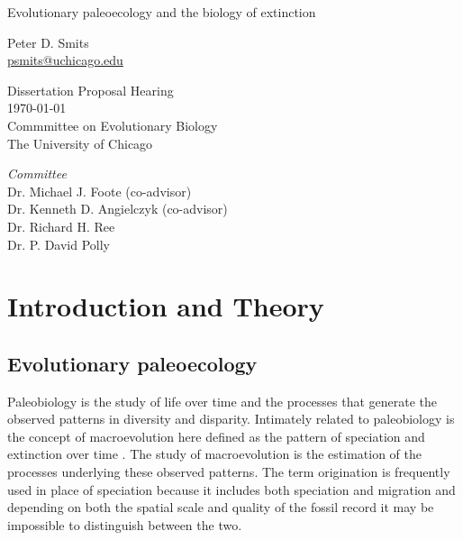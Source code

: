 \documentclass[12pt,letterpaper]{article}
\begin{document}
\setcounter{secnumdepth}{0}

\begin{titlepage}
  \begin{center}
    \huge{Evolutionary paleoecology and the biology of extinction}

    \vspace{1.5cm}

    \large{Peter D. Smits \\}
    \footnotesize{\href{mailto:psmits@uchicago.edu}{psmits@uchicago.edu}}

    \vspace{1.5cm}

    Dissertation Proposal Hearing \\
    \today \\
    Commmittee on Evolutionary Biology \\
    The University of Chicago

    \vspace{1.5cm}

    \textit{Committee} \\
    Dr. Michael J. Foote (co-advisor) \\
    Dr. Kenneth D. Angielczyk (co-advisor) \\
    Dr. Richard H. Ree \\
    Dr. P. David Polly
  \end{center}
\end{titlepage}

\linenumbers
\modulolinenumbers[2]


\section{Introduction and Theory}

\subsection{Evolutionary paleoecology}
Paleobiology is the study of life over time and the processes that generate the observed patterns in diversity and disparity. Intimately related to paleobiology is the concept of macroevolution here defined as the pattern of speciation and extinction over time \citep{Jablonski2008a}. The study of macroevolution is the estimation of the processes underlying these observed patterns. The term origination is frequently used in place of speciation because it includes both speciation and migration and depending on both the spatial scale and quality of the fossil record it may be impossible to distinguish between the two.
\end{document}
